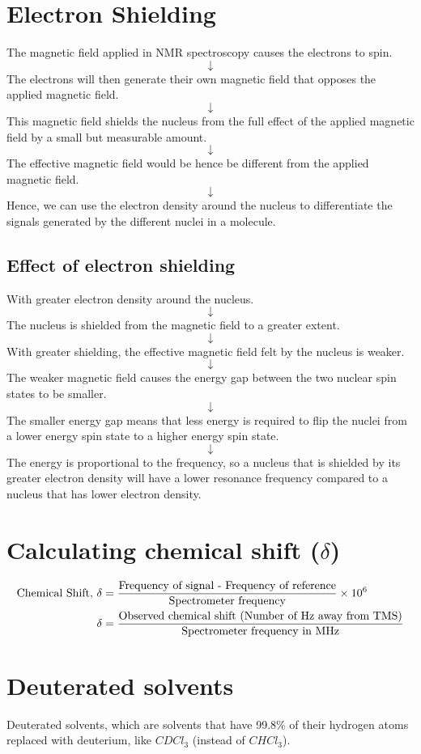 \documentclass[11pt]{article}
\begin{document}
\newpage

\section{Electron Shielding}
\label{sec:orgab68d09}
The magnetic field applied in NMR spectroscopy causes the electrons to spin.
\[\downarrow\]
The electrons will then generate their own magnetic field that opposes the applied magnetic field.
\[\downarrow\]
This magnetic field shields the nucleus from the full effect of the applied magnetic field by a small but measurable amount.
\[\downarrow\]
The effective magnetic field would be hence be different from the applied magnetic field.
\[\downarrow\]
Hence, we can use the electron density around the nucleus to differentiate the signals generated by the different nuclei in a molecule.

\subsection{Effect of electron shielding}
\label{sec:org1aa9af6}
With greater electron density around the nucleus.
\[\downarrow\]
The nucleus is shielded from the magnetic field to a greater extent.
\[\downarrow\]
With greater shielding, the effective magnetic field felt by the nucleus is weaker.
\[\downarrow\]
The weaker magnetic field causes the energy gap between the two nuclear spin states to be smaller.
\[\downarrow\]
The smaller energy gap means that less energy is required to flip the nuclei from a lower energy spin state to a higher energy spin state.
\[\downarrow\]
The energy is proportional to the frequency, so a nucleus that is shielded by its greater electron density will have a lower resonance frequency compared to a nucleus that has lower electron density.

\section{Calculating chemical shift (\(\delta\))}
\label{sec:orgef6e744}
\begin{align*}
\text{Chemical Shift, } \delta &= \frac{\text{Frequency of signal - Frequency of reference}}{\text{Spectrometer frequency}} \times 10^6 \\
\delta &= \frac{\text{Observed chemical shift (Number of \si{\hertz} away from TMS)}}{\text{Spectrometer frequency in \si{\mega\hertz}}}
\end{align*}

\section{Deuterated solvents}
\label{sec:orge2b72af}
Deuterated solvents, which are solvents that have 99.8\% of their hydrogen atoms replaced with deuterium, like \(CDCl_3\) (instead of \(CHCl_3\)).
\end{document}

